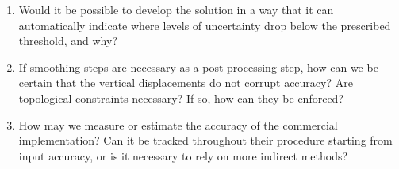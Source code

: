 \begin{enumerate}
\begin{enumerate}
        \item Would it be possible to develop the solution in a way that it can automatically indicate where levels of uncertainty drop below the prescribed threshold, and why?
        \item If smoothing steps are necessary as a post-processing step, how can we be certain that the vertical displacements do not corrupt accuracy? Are topological constraints necessary? If so, how can they be enforced?
        \item How may we measure or estimate the accuracy of the commercial implementation? Can it be tracked throughout their procedure starting from input accuracy, or is it necessary to rely on more indirect methods?
    \end{enumerate}
\end{enumerate}